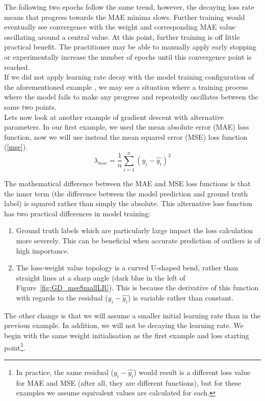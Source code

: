 \noindent
The following two epochs follow the same trend, however, the decaying loss rate means that progress towards the MAE minima slows. Further training would eventually see convergence with the weight and corresponding MAE value oscillating around a central value. At this point, further training is off little practical benefit. The practitioner may be able to manually apply early stopping \cite{yao2007early} or experimentally increase the number of epochs until this convergence point is reached. \\ 

\noindent
If we did not apply learning rate decay with the model training configuration of the aforementioned example , we may see a situation where a training process where the model fails to make any progress and repeatedly oscillates between the same two points. \\

\noindent
Lets now look at another example of gradient descent with alternative parameters. In our first example, we used the mean absolute error (MAE) loss function, now we will use instead the mean squared error (MSE) loss function (\ref{mse}). \\

\begin{equation} \label{mse}
	\lambda_{mse} = \frac{1}{n}\sum_{i=1}^n (y_i - \hat{y_i})^2
\end{equation}

\noindent
The mathematical difference between the MAE and MSE loss functions is that the inner term (the difference between the model prediction and ground truth label) is squared rather than simply the absolute. This alternative loss function has two practical differences in model training: 

\begin{enumerate}
	\item  Ground truth labels which are particularly large impact the loss calculation more severely. This can be beneficial when accurate prediction of outliers is of high importance.
	
	\item The loss-weight value topology is a curved U-shaped bend, rather than straight lines at a sharp angle (dark blue in the left of Figure~\ref{fig:GD_mseSmallLR}). This is because the derivative of this function with regards to the residual ($y_i - \hat{y_i}$) is variable rather than constant.
\end{enumerate}

\noindent
The other change is that we will assume a smaller initial learning rate than in the previous example.  In addition, we will not be decaying the learning rate. We begin with the same weight initialisation as the first example and loss starting point\footnote{In practice, the same residual ($y_i - \hat{y_i}$) would result is a different loss value for MAE and MSE (after all, they are different functions), but for these examples we assume equivalent values are calculated for each.}. \\

